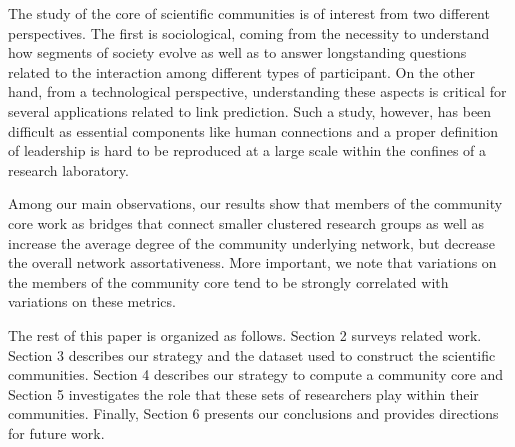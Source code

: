 The study of the core of scientific communities is of interest from two different perspectives.  The first is sociological, coming from the necessity to understand how
segments of society evolve as well as to answer longstanding  questions related to the interaction among different types of participant. On the other hand, from a technological perspective,
understanding these aspects is critical for several applications related to link prediction. Such a study, however, has been difficult as essential components like human connections 
and a proper definition of leadership is hard to be reproduced at a large scale within the confines of a research laboratory.

Among our main observations, our results show that members of the community core work as bridges that connect smaller clustered research groups as well as increase the average
degree of the community underlying network, but decrease the overall network assortativeness. More important, we note that variations on the members of the community core tend to be strongly correlated
with variations on these metrics.

The rest of this paper is organized as follows. Section 2 surveys related work. Section 3 describes our strategy and the dataset used to construct the 
scientific communities.  Section 4 describes our strategy to compute a community core and Section 5 investigates the
role that these sets of researchers play within their communities.  Finally, Section 6 presents our conclusions and provides directions for future work. 





